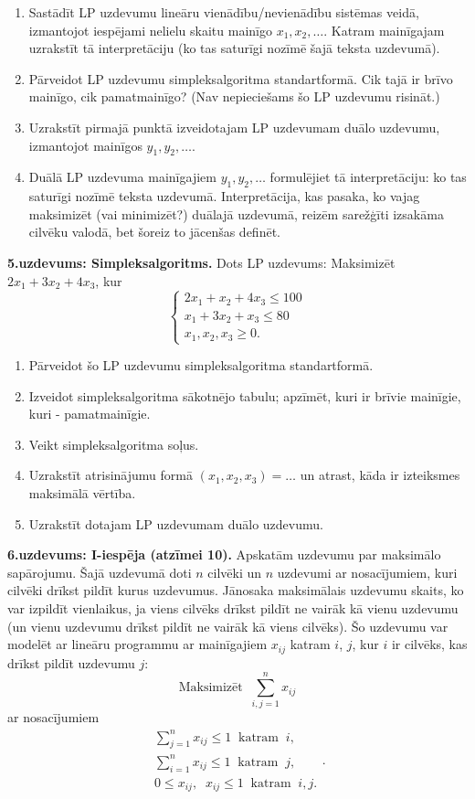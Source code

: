 \documentclass[11pt]{article}
\begin{document}
\begin{enumerate}[label=(\alph*)]
\item Sastādīt LP uzdevumu lineāru vienādību/nevienādību sistēmas veidā, izmantojot
iespējami nelielu skaitu mainīgo $x_1,x_2,\ldots$. 
Katram mainīgajam uzrakstīt tā interpretāciju (ko tas saturīgi nozīmē
šajā teksta uzdevumā).
\item Pārveidot LP uzdevumu simpleksalgoritma standartformā. Cik 
tajā ir brīvo mainīgo, cik pamatmainīgo? (Nav nepieciešams šo LP uzdevumu risināt.)
\item Uzrakstīt pirmajā punktā izveidotajam LP uzdevumam duālo uzdevumu, izmantojot
mainīgos $y_1,y_2,\ldots$.
\item Duālā LP uzdevuma mainīgajiem $y_1,y_2,\ldots$ formulējiet tā 
interpretāciju: ko tas saturīgi nozīmē teksta uzdevumā. Interpretācija, 
kas pasaka, ko vajag maksimizēt (vai minimizēt?) duālajā uzdevumā, reizēm 
sarežģīti izsakāma cilvēku valodā, bet šoreiz to jācenšas definēt.
\end{enumerate}

\vspace{6pt}
{\bf 5.uzdevums: Simpleksalgoritms.} 
Dots LP uzdevums: Maksimizēt $2x_1 + 3x_2 + 4x_3$, kur 
$$\left\{ \begin{array}{l}
2x_1 + x_2 + 4x_3 \leq 100\\
x_1 + 3x_2 + x_3 \leq 80\\
x_1,x_2,x_3 \geq 0. \end{array} \right.$$
\begin{enumerate}[label=(\alph*)]
\item Pārveidot šo LP uzdevumu simpleksalgoritma standartformā.
\item Izveidot simpleksalgoritma sākotnējo tabulu; apzīmēt, 
kuri ir brīvie mainīgie, kuri - pamatmainīgie.
\item Veikt simpleksalgoritma soļus. 
\item Uzrakstīt atrisinājumu formā $(x_1,x_2,x_3)=\ldots$ un atrast, kāda 
ir izteiksmes maksimālā vērtība.
\item Uzrakstīt dotajam LP uzdevumam duālo uzdevumu.
\end{enumerate}

\vspace{6pt}
{\bf 6.uzdevums: I-iespēja (atzīmei 10).} 
Apskatām uzdevumu par maksimālo sapārojumu. 
Šajā uzdevumā doti $n$ cilvēki un $n$ uzdevumi ar nosacījumiem, kuri
cilvēki drīkst pildīt kurus uzdevumus. Jānosaka maksimālais uzdevumu
skaits, ko var izpildīt vienlaikus, ja viens cilvēks drīkst pildīt ne vairāk
kā vienu uzdevumu (un vienu uzdevumu drīkst pildīt ne vairāk kā viens
cilvēks). Šo uzdevumu var modelēt ar lineāru programmu ar mainīgajiem
$x_{ij}$ katram $i$, $j$, kur $i$ ir cilvēks, kas drīkst pildīt uzdevumu $j$:
$$\text{Maksimizēt}\;\;\sum\limits_{i,j=1}^{n} x_{ij}$$
ar nosacījumiem
$$\begin{array}{l}
\sum\limits_{j=1}^n x_{ij} \leq 1\;\;\text{katram}\;\;i,\\
\sum\limits_{i=1}^n x_{ij} \leq 1\;\;\text{katram}\;\;j,\\
0 \leq x_{ij},\;\;x_{ij} \leq 1\;\;\text{katram}\;\;i,j.
\end{array}.$$
\end{document}
